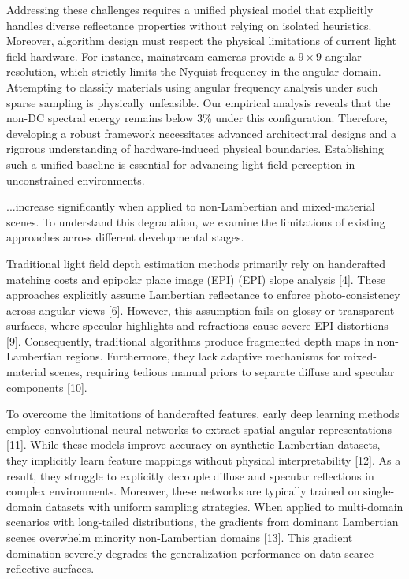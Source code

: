 Addressing these challenges requires a unified physical model that explicitly handles diverse reflectance properties without relying on isolated heuristics. Moreover, algorithm design must respect the physical limitations of current light field hardware. For instance, mainstream cameras provide a $9 \times 9$ angular resolution, which strictly limits the Nyquist frequency in the angular domain. Attempting to classify materials using angular frequency analysis under such sparse sampling is physically unfeasible. Our empirical analysis reveals that the non-DC spectral energy remains below 3\% under this configuration. Therefore, developing a robust framework necessitates advanced architectural designs and a rigorous understanding of hardware-induced physical boundaries. Establishing such a unified baseline is essential for advancing light field perception in unconstrained environments.

...increase significantly when applied to non-Lambertian and mixed-material scenes. To understand this degradation, we examine the limitations of existing approaches across different developmental stages.

Traditional light field depth estimation methods primarily rely on handcrafted matching costs and epipolar plane image (EPI) (EPI) slope analysis [4]. These approaches explicitly assume Lambertian reflectance to enforce photo-consistency across angular views [6]. However, this assumption fails on glossy or transparent surfaces, where specular highlights and refractions cause severe EPI distortions [9]. Consequently, traditional algorithms produce fragmented depth maps in non-Lambertian regions. Furthermore, they lack adaptive mechanisms for mixed-material scenes, requiring tedious manual priors to separate diffuse and specular components [10].

To overcome the limitations of handcrafted features, early deep learning methods employ convolutional neural networks to extract spatial-angular representations [11]. While these models improve accuracy on synthetic Lambertian datasets, they implicitly learn feature mappings without physical interpretability [12]. As a result, they struggle to explicitly decouple diffuse and specular reflections in complex environments. Moreover, these networks are typically trained on single-domain datasets with uniform sampling strategies. When applied to multi-domain scenarios with long-tailed distributions, the gradients from dominant Lambertian scenes overwhelm minority non-Lambertian domains [13]. This gradient domination severely degrades the generalization performance on data-scarce reflective surfaces.

